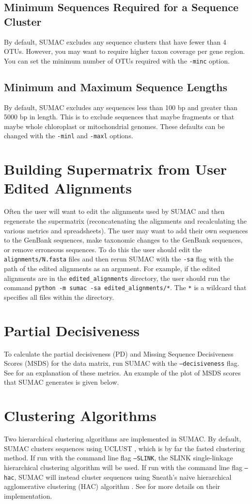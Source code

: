 \documentclass[10pt]{report}
\begin{document}
\subsection{Minimum Sequences Required for a Sequence Cluster}
By default, SUMAC excludes any sequence clusters that
have fewer than 4 OTUs. However, you may want to require
higher taxon coverage per gene region. You can set
the minimum number of OTUs required with the \verb|-minc| option.

\subsection{Minimum and Maximum Sequence Lengths}
By default, SUMAC excludes any sequences less than 100 bp and greater
than 5000 bp in length. This is to exclude sequences that maybe fragments
or that maybe whole chloroplast or mitochondrial genomes.
These defaults can be changed with the \verb|-minl| and \verb|-maxl| options.

\section{Building Supermatrix from User Edited Alignments}
Often the user will want to edit the alignments used by SUMAC
and then regenerate the supermatrix (reconcatenating the alignments and
recalculating the various metrics and spreadsheets). The user may want to add their own
sequences to the GenBank sequences, make taxonomic changes to the GenBank sequences, or remove erroneous
sequences. To do this the user should edit the \texttt{alignments/N.fasta}
files and then rerun SUMAC with the \texttt{-sa} flag with the path
of the edited alignments as an argument. For example, if the edited
alignments are in the \texttt{edited\_alignments} directory, the user
should run the command \texttt{python -m sumac -sa edited\_alignments/*}. 
The \texttt{*} is a wildcard that specifies all files within the directory.


\section{Partial Decisiveness}
To calculate the partial decisiveness (PD) and Missing Sequence Decisiveness Scores (MSDS)
for the data matrix, run SUMAC with the \texttt{--decisiveness} flag.
See \citet{sumac} for an explanation of these metrics. 
An example of the plot of MSDS scores that SUMAC generates is given below.

\section{Clustering Algorithms}
Two hierarchical clustering algorithms are implemented in SUMAC.
By default, SUMAC clusters sequences using UCLUST \citep{edgar2010search}, which is by far the fasted clustering method.
If run with the command line flag \texttt{--SLINK}, the SLINK single-linkage hierarchical clustering algorithm \citep{Sibson1973} will be used.
If run with the command line flag \texttt{--hac}, SUMAC will instead cluster sequences using Sneath's naive
hierarchical agglomerative clustering (HAC) algorithm \citep{Sneath1957}.
See \citet{sumac} for more details on their implementation.
\end{document}
